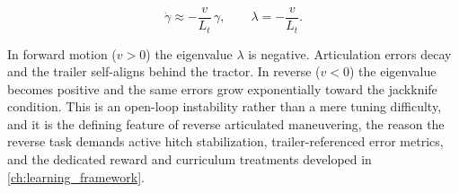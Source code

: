 \begin{equation}
    \dot{\gamma} \approx -\frac{v}{L_t}\,\gamma,
    \qquad \lambda = -\frac{v}{L_t} .
    \label{eq:hitch_eig}
\end{equation}

In forward motion ($v > 0$) the eigenvalue $\lambda$ is negative. Articulation errors decay
and the trailer self-aligns behind the tractor. In reverse ($v < 0$) the eigenvalue becomes
positive and the same errors grow exponentially toward the jackknife condition. This is an
open-loop instability rather than a mere tuning difficulty, and it is the defining feature of
reverse articulated maneuvering, the reason the reverse task demands active hitch
stabilization, trailer-referenced error metrics, and the dedicated reward and curriculum
treatments developed in \cref{ch:learning_framework}.
